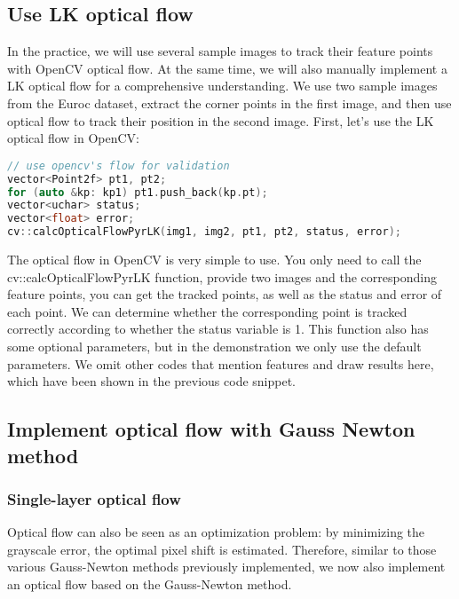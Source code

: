 {%
%
\subsection{Use LK optical flow}
In the practice, we will use several sample images to track their feature points with OpenCV optical flow. At the same time, we will also manually implement a LK optical flow for a comprehensive understanding. We use two sample images from the Euroc dataset, extract the corner points in the first image, and then use optical flow to track their position in the second image. First, let's use the LK optical flow in OpenCV:

\begin{lstlisting}[language=c++,caption=slambook2/ch8/optical_flow.cpp (snippet))]
// use opencv's flow for validation
vector<Point2f> pt1, pt2;
for (auto &kp: kp1) pt1.push_back(kp.pt);
vector<uchar> status;
vector<float> error;
cv::calcOpticalFlowPyrLK(img1, img2, pt1, pt2, status, error);
\end{lstlisting}

The optical flow in OpenCV is very simple to use. You only need to call the cv::calcOpticalFlowPyrLK function, provide two images and the corresponding feature points, you can get the tracked points, as well as the status and error of each point. We can determine whether the corresponding point is tracked correctly according to whether the status variable is 1. This function also has some optional parameters, but in the demonstration we only use the default parameters. We omit other codes that mention features and draw results here, which have been shown in the previous code snippet.

\subsection{Implement optical flow with Gauss Newton method}
\subsubsection{Single-layer optical flow}
Optical flow can also be seen as an optimization problem: by minimizing the grayscale error, the optimal pixel shift is estimated. Therefore, similar to those various Gauss-Newton methods previously implemented, we now also implement an optical flow based on the Gauss-Newton method.

}
